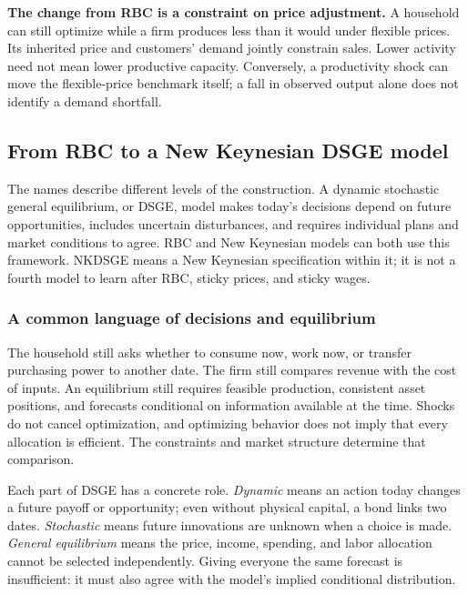 \begin{greenblock}
\textbf{The change from RBC is a constraint on price adjustment.}
A household can still optimize while a firm produces less than it would under
flexible prices. Its inherited price and customers' demand jointly constrain
sales. Lower activity need not mean lower productive capacity. Conversely, a
productivity shock can move the flexible-price benchmark itself; a fall in
observed output alone does not identify a demand shortfall.
\end{greenblock}

\subsection{From RBC to a New Keynesian DSGE model}
\label{sec:rbc-nk-transition}

The names describe different levels of the construction. A dynamic stochastic
general equilibrium, or DSGE, model makes today's decisions depend on future
opportunities, includes uncertain disturbances, and requires individual plans
and market conditions to agree. RBC and New Keynesian models can both use
this framework. NKDSGE means a New Keynesian specification within it; it is
not a fourth model to learn after RBC, sticky prices, and sticky wages.

\subsubsection{A common language of decisions and equilibrium}

The household still asks whether to consume now, work now, or transfer purchasing
power to another date. The firm still compares revenue with the cost of inputs.
An equilibrium still requires feasible production, consistent asset positions,
and forecasts conditional on information available at the time. Shocks do not
cancel optimization, and optimizing behavior does not imply that every allocation
is efficient. The constraints and market structure determine that comparison.

Each part of DSGE has a concrete role. \emph{Dynamic} means an action today
changes a future payoff or opportunity; even without physical capital, a bond
links two dates. \emph{Stochastic} means future innovations are unknown when
a choice is made. \emph{General equilibrium} means the price, income, spending,
and labor allocation cannot be selected independently. Giving everyone the
same forecast is insufficient: it must also agree with the model's implied
conditional distribution.


